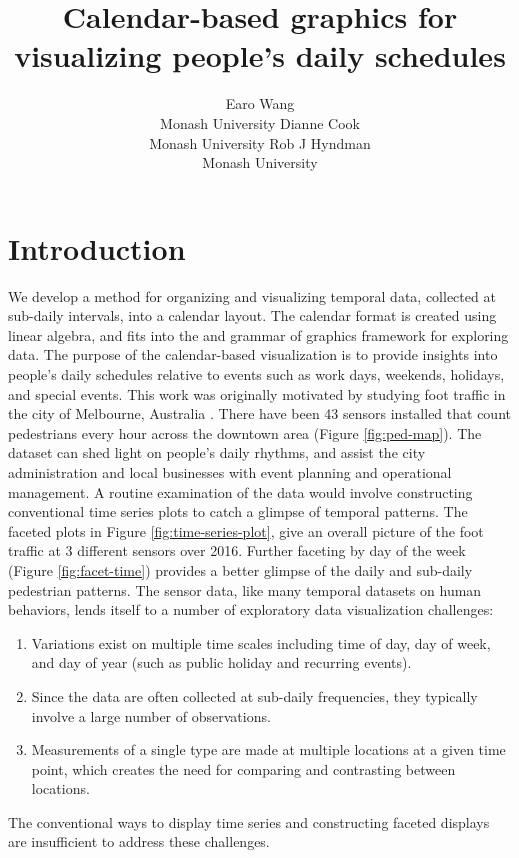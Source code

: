 \documentclass[article]{jss}
\author{
Earo Wang\\Monash University \And Dianne Cook\\Monash University \And Rob J Hyndman\\Monash University
}
\title{Calendar-based graphics for visualizing people's daily schedules}
\providecommand{\tightlist}{%
  \setlength{\itemsep}{0pt}\setlength{\parskip}{0pt}}
\theoremstyle{definition}
\theoremstyle{definition}
\theoremstyle{definition}
\theoremstyle{remark}
\begin{document}
\section{Introduction}\label{introduction}

We develop a method for organizing and visualizing temporal data,
collected at sub-daily intervals, into a calendar layout. The calendar
format is created using linear algebra, and fits into the
 \citep{R-tidyverse} and grammar of graphics
\citep{wickham2009ggplot2} framework for exploring data. The purpose of
the calendar-based visualization is to provide insights into people's
daily schedules relative to events such as work days, weekends,
holidays, and special events. This work was originally motivated by
studying foot traffic in the city of Melbourne, Australia \citep{ped}.
There have been 43 sensors installed that count pedestrians every hour
across the downtown area (Figure \ref{fig:ped-map}). The dataset can
shed light on people's daily rhythms, and assist the city administration
and local businesses with event planning and operational management. A
routine examination of the data would involve constructing conventional
time series plots to catch a glimpse of temporal patterns. The faceted
plots in Figure \ref{fig:time-series-plot}, give an overall picture of
the foot traffic at 3 different sensors over 2016. Further faceting by
day of the week (Figure \ref{fig:facet-time}) provides a better glimpse
of the daily and sub-daily pedestrian patterns. The sensor data, like
many temporal datasets on human behaviors, lends itself to a number of
exploratory data visualization challenges:

\begin{enumerate}
\def\labelenumi{\arabic{enumi}.}
\tightlist
\item
  Variations exist on multiple time scales including time of day, day of
  week, and day of year (such as public holiday and recurring events).
\item
  Since the data are often collected at sub-daily frequencies, they
  typically involve a large number of observations.
\item
  Measurements of a single type are made at multiple locations at a
  given time point, which creates the need for comparing and contrasting
  between locations.
\end{enumerate}

The conventional ways to display time series and constructing faceted
displays are insufficient to address these challenges.
\end{document}
